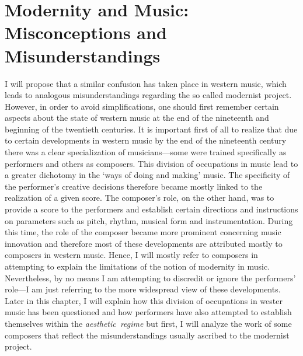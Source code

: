 \section{Modernity and Music: Misconceptions and Misunderstandings}

I will propose that a similar confusion has taken place in western music, which leads to analogous misunderstandings regarding the so called modernist project. However, in order to avoid simplifications, one should first remember certain aspects about the state of western music at the end of the nineteenth and beginning of the twentieth centuries. It is important first of all to realize that due to certain developments in western music by the end of the nineteenth century there was a clear specialization of musicians---some were trained specifically as performers and others as composers. This division of occupations in music lead to a greater dichotomy in the `ways of doing and making' music. The specificity of the performer's creative decisions therefore became mostly linked to the realization of a given score. The composer's role, on the other hand, was to provide a score to the performers and establish certain directions and instructions on parameters such as pitch, rhythm, musical form and instrumentation. During this time, the role of the composer became more prominent concerning music innovation and therefore most of these developments are attributed mostly to composers in western music. Hence, I will mostly refer to composers in attempting to explain the limitations of the notion of modernity in music. Nevertheless, by no means I am attempting to discredit or ignore the performers' role---I am just referring to the more widespread view of these developments. Later in this chapter, I will explain how this division of occupations in wester music has been questioned and how performers have also attempted to establish themselves within the \mbox{\emph{aesthetic regime}} but first, I will analyze the work of some composers that reflect the misunderstandings usually ascribed to the modernist project. 

